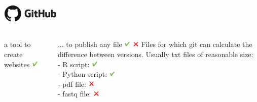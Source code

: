 \begin{frame}{\includegraphics[height=1cm]{shared/logo-github.png}}
\begin{columns}
\begin{block}{a tool to create websites \includegraphics[height=0.3cm]{05_history/Images/FAIR_yes.png}}
\begin{center}
\end{center}
\end{block}
\begin{block}{... to publish any file \includegraphics[height=0.3cm]{05_history/Images/FAIR_yes.png} \includegraphics[height=0.3cm]{05_history/Images/FAIR_no.png}}
Files for which git can calculate the difference between versions.
Usually txt files of reasonable size:\\
- R script: \includegraphics[height=0.3cm]{05_history/Images/FAIR_yes.png}\\
- Python script: \includegraphics[height=0.3cm]{05_history/Images/FAIR_yes.png}\\
- pdf file: \includegraphics[height=0.3cm]{05_history/Images/FAIR_no.png}\\
- fastq file: \includegraphics[height=0.3cm]{05_history/Images/FAIR_no.png}
\end{block}
\end{columns}
\end{frame}
